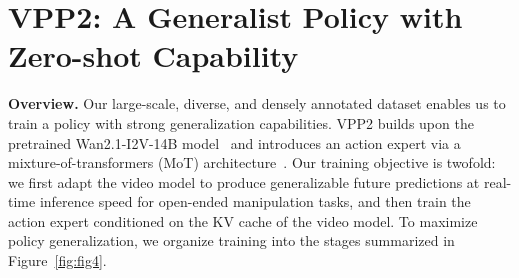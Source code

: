 \section{VPP2: A Generalist Policy with Zero-shot Capability}

\textbf{Overview.}
Our large-scale, diverse, and densely annotated dataset enables us to train a policy with strong generalization capabilities. VPP2 builds upon the pretrained Wan2.1-I2V-14B model~\citep{wan2025wan} and introduces an action expert via a mixture-of-transformers (MoT) architecture~\citep{liang2025mixture}. Our training objective is twofold: we first adapt the video model to produce generalizable future predictions at real-time inference speed for open-ended manipulation tasks, and then train the action expert conditioned on the KV cache of the video model. To maximize policy generalization, we organize training into the stages summarized in Figure~\ref{fig:fig4}.


